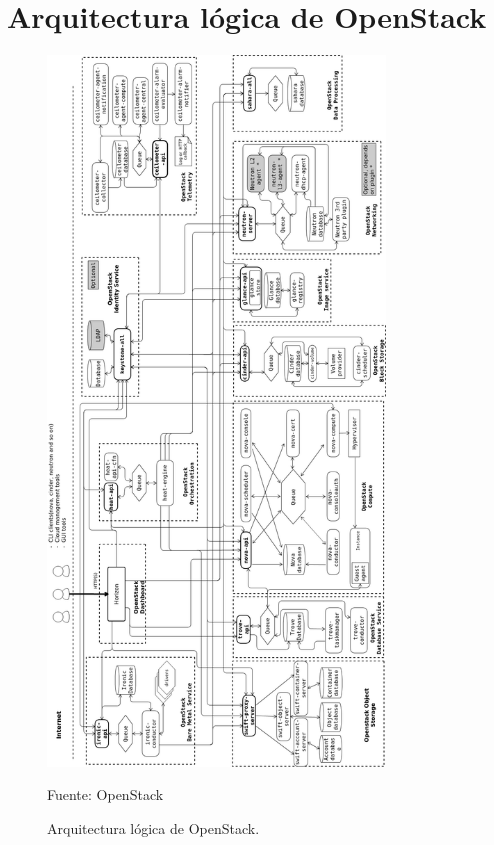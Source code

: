 \chapter{Arquitectura lógica de OpenStack} \label{chap:arquitectura}

\begin{figure}
    \centering
    \includegraphics[width=0.8\textwidth]{imagenes/apendices/esquemaLogicoOpenStack1.png}
    \caption{Arquitectura lógica de OpenStack.}
	\vspace{0.3cm}
    \footnotesize{Fuente: OpenStack}
    \label{arquitectura-logica-OpenStack}
\end{figure}

